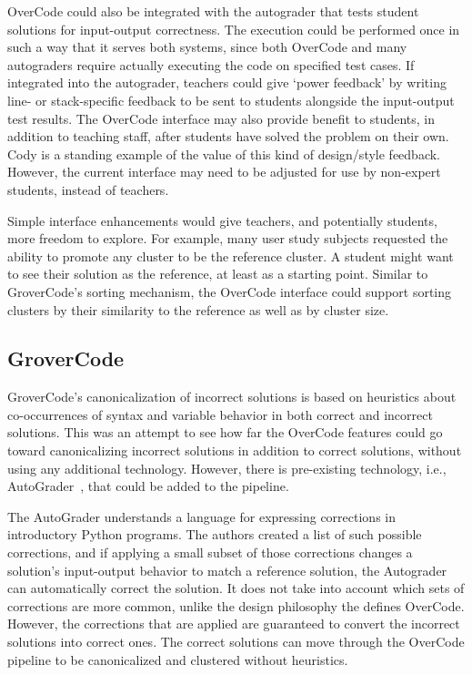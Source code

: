 OverCode could also be integrated with the autograder that tests student solutions for input-output correctness. The execution could be performed once in such a way that it serves both systems, since both OverCode and many autograders require actually executing the code on specified test cases. If integrated into the autograder, teachers could give `power feedback' by writing line- or stack-specific feedback to be sent to students alongside the input-output test results. The OverCode interface may also provide benefit to students, in addition to teaching staff, after students have solved the problem on their own. Cody is a standing example of the value of this kind of design/style feedback. However, the current interface may need to be adjusted for use by non-expert students, instead of teachers. %

Simple interface enhancements would give teachers, and potentially students, more freedom to explore. For example, many user study subjects requested the ability to promote any cluster to be the reference cluster. A student might want to see their solution as the reference, at least as a starting point. Similar to GroverCode's sorting mechanism, the OverCode interface could support sorting clusters by their similarity to the reference as well as by cluster size. 


\subsection{GroverCode}

GroverCode's canonicalization of incorrect solutions is based on heuristics about co-occurrences of syntax and variable behavior in both correct and incorrect solutions. This was an attempt to see how far the OverCode features could go toward canonicalizing incorrect solutions in addition to correct solutions, without using any additional technology. However, there is pre-existing technology, i.e., AutoGrader~\cite{autograder}, that could be added to the pipeline. 

The AutoGrader understands a language for expressing corrections in introductory Python programs. The authors created a list of such possible corrections, and if applying a small subset of those corrections changes a solution's input-output behavior to match a reference solution, the Autograder can automatically correct the solution. It does not take into account which sets of corrections are more common, unlike the design philosophy the defines OverCode. However, the corrections that are applied are guaranteed to convert the incorrect solutions into correct ones. The correct solutions can move through the OverCode pipeline to be canonicalized and clustered without heuristics. 

